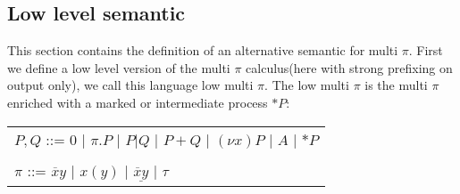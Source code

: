 \subsection{Low level semantic}
This section contains the definition of an alternative semantic for multi $\pi$. First we define a low level version of the multi $\pi$ calculus(here with strong prefixing on output only), we call this language low multi $\pi$. The low multi $\pi$ is the multi $\pi$ enriched with a marked or intermediate process $*P$:
\begin{center}
   \begin{tabular}{l}
     $P,Q$ ::= $0$ | $\pi.P$ | $P|Q$ | $P+Q$ | $(\nu x) P$ | $A$ | $*P$
   \\\\
     $\pi$ ::= $\overline{x}y$ | $x(y)$ | $\underline{\overline{x}y}$ | $\tau$ 
   \end{tabular}
\end{center}
